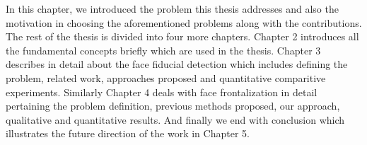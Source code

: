 % 
%     
% 

In this chapter, we introduced the problem this thesis addresses and also the motivation
in choosing the aforementioned problems along with the contributions.
The rest of the thesis is divided into four more chapters. Chapter 2 introduces all the
fundamental concepts briefly which are used in the thesis. Chapter 3 describes in detail
about the face fiducial detection which includes defining the problem, related work, 
approaches proposed and quantitative comparitive experiments. Similarly Chapter 4 deals
with face frontalization in detail pertaining the problem definition, previous methods
proposed, our approach, qualitative and quantitative results. And finally we end with
conclusion which illustrates the future direction of the work in Chapter 5.
